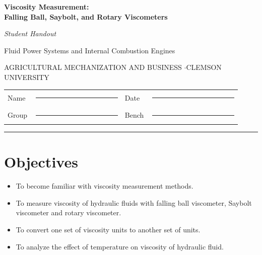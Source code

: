 \documentclass[11pt,a4paper]{article}
\begin{document}
\thispagestyle{firstpage}

\begin{center}
  {\LARGE\bfseries Viscosity Measurement:\\[2pt]
   Falling Ball, Saybolt, and Rotary Viscometers\par}
  \vspace{5pt}
  {\large\itshape Student Handout\par}
  \vspace{3pt}
  {\normalsize Fluid Power Systems and Internal Combustion Engines\par}
  \vspace{4pt}
  {\footnotesize\sffamily\color{ink3}
   AGRICULTURAL MECHANIZATION AND BUSINESS \quad$\cdot$\quad CLEMSON UNIVERSITY\par}
\end{center}
\vspace{6pt}

\noindent
\begin{tabular}{@{}p{0.11\linewidth}p{0.36\linewidth}p{0.09\linewidth}p{0.36\linewidth}@{}}
Name  & \rule{\linewidth}{0.4pt} & Date  & \rule{\linewidth}{0.4pt} \\
Group & \rule{\linewidth}{0.4pt} & Bench & \rule{\linewidth}{0.4pt} \\
\end{tabular}

\vspace{4pt}
\noindent\rule{\linewidth}{1pt}
\vspace{2pt}

\section{Objectives}
\begin{itemize}
  \item To become familiar with viscosity measurement methods.
  \item To measure viscosity of hydraulic fluids with falling ball viscometer, Saybolt
        viscometer and rotary viscometer.
  \item To convert one set of viscosity units to another set of units.
  \item To analyze the effect of temperature on viscosity of hydraulic fluid.
\end{itemize}
\end{document}
